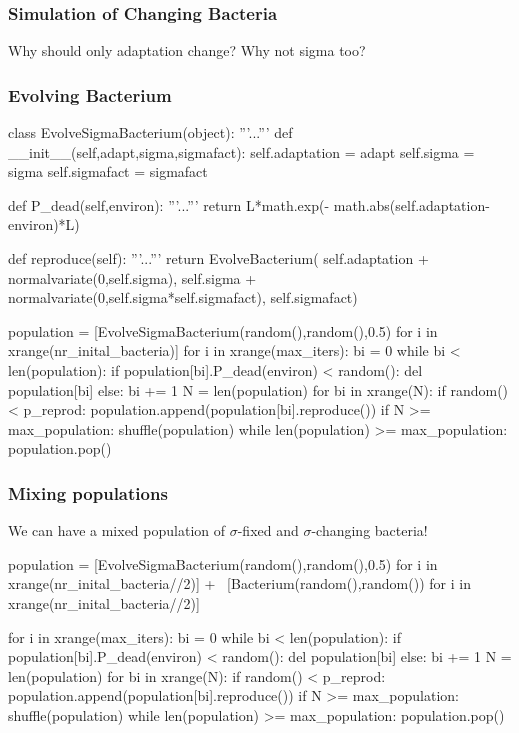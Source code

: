 \begin{frame}[fragile]
\frametitle{Simulation of Changing Bacteria}

Why should only adaptation change? Why not \alert{sigma} too?

\end{frame}

\begin{frame}[fragile]
\frametitle{Evolving Bacterium}

\begin{python}
class EvolveSigmaBacterium(object):
    '''...'''
    def __init__(self,adapt,sigma,sigmafact):
        self.adaptation = adapt
        self.sigma = sigma
        self.sigmafact = sigmafact

    def P_dead(self,environ):
        '''...'''
        return L*math.exp(-
                math.abs(self.adaptation-environ)*L)
    
    def reproduce(self):
        '''...'''
        return EvolveBacterium(
            self.adaptation + normalvariate(0,self.sigma),
            self.sigma + normalvariate(0,self.sigma*self.sigmafact),
            self.sigmafact)
\end{python}
\end{frame}

\begin{frame}[fragile]
\begin{python}
population = [EvolveSigmaBacterium(random(),random(),0.5)
        for i in xrange(nr_inital_bacteria)]
for i in xrange(max_iters):
    bi = 0
    while bi < len(population):
        if population[bi].P_dead(environ) < random():
            del population[bi]
        else:
            bi += 1
    N = len(population)
    for bi in xrange(N):
        if random() < p_reprod:
            population.append(population[bi].reproduce())
    if N >= max_population:
        shuffle(population)
        while len(population) >= max_population:
            population.pop()
\end{python}
\end{frame}

\begin{frame}[fragile]
\frametitle{Mixing populations}
We can have a mixed population of $\sigma$-fixed and $\sigma$-changing bacteria!
\end{frame}

\begin{frame}[fragile]
\begin{python}
population = [EvolveSigmaBacterium(random(),random(),0.5)
        for i in xrange(nr_inital_bacteria//2)] + \
        [Bacterium(random(),random())
        for i in xrange(nr_inital_bacteria//2)]

for i in xrange(max_iters):
    bi = 0
    while bi < len(population):
        if population[bi].P_dead(environ) < random():
            del population[bi]
        else:
            bi += 1
    N = len(population)
    for bi in xrange(N):
        if random() < p_reprod:
            population.append(population[bi].reproduce())
    if N >= max_population:
        shuffle(population)
        while len(population) >= max_population:
            population.pop()
\end{python}
\end{frame}


